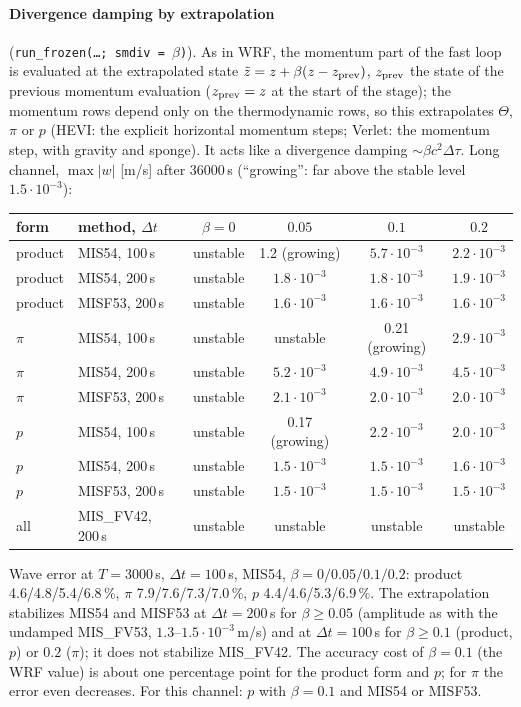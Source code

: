 \documentclass[11pt,a4paper]{article}
\newcommand{\code}[1]{\texttt{#1}}
\newcommand{\dt}{\Delta t}
\begin{document}
\paragraph{Divergence damping by extrapolation} (\code{run\_frozen(\dots; smdiv = $\beta$)}). As in WRF,
the momentum part of the fast loop is evaluated at the extrapolated state
$\tilde z=z+\beta(z-z_{\rm prev})$, $z_{\rm prev}$ the state of the previous momentum evaluation
($z_{\rm prev}=z$ at the start of the stage); the momentum rows depend only on the thermodynamic rows,
so this extrapolates $\Theta$, $\pi$ or $p$ (HEVI: the explicit horizontal momentum steps; Verlet: the
momentum step, with gravity and sponge). It acts like a divergence damping $\sim\beta c^2\Delta\tau$.
Long channel, $\max|w|$ [m/s] after 36000\,s (``growing'': far above the stable level
$1.5\cdot10^{-3}$):
\begin{center}\begin{tabular}{llcccc}\toprule
form & method, $\dt$ & $\beta=0$ & $0.05$ & $0.1$ & $0.2$\\\midrule
product & MIS54, 100\,s & unstable & 1.2 (growing) & $5.7\cdot10^{-3}$ & $2.2\cdot10^{-3}$\\
product & MIS54, 200\,s & unstable & $1.8\cdot10^{-3}$ & $1.8\cdot10^{-3}$ & $1.9\cdot10^{-3}$\\
product & MISF53, 200\,s & unstable & $1.6\cdot10^{-3}$ & $1.6\cdot10^{-3}$ & $1.6\cdot10^{-3}$\\
$\pi$ & MIS54, 100\,s & unstable & unstable & 0.21 (growing) & $2.9\cdot10^{-3}$\\
$\pi$ & MIS54, 200\,s & unstable & $5.2\cdot10^{-3}$ & $4.9\cdot10^{-3}$ & $4.5\cdot10^{-3}$\\
$\pi$ & MISF53, 200\,s & unstable & $2.1\cdot10^{-3}$ & $2.0\cdot10^{-3}$ & $2.0\cdot10^{-3}$\\
$p$ & MIS54, 100\,s & unstable & 0.17 (growing) & $2.2\cdot10^{-3}$ & $2.0\cdot10^{-3}$\\
$p$ & MIS54, 200\,s & unstable & $1.5\cdot10^{-3}$ & $1.5\cdot10^{-3}$ & $1.6\cdot10^{-3}$\\
$p$ & MISF53, 200\,s & unstable & $1.5\cdot10^{-3}$ & $1.5\cdot10^{-3}$ & $1.5\cdot10^{-3}$\\
all & MIS\_FV42, 200\,s & unstable & unstable & unstable & unstable\\\bottomrule
\end{tabular}\end{center}
Wave error at $T=3000$\,s, $\dt=100$\,s, MIS54, $\beta=0/0.05/0.1/0.2$: product 4.6/4.8/5.4/6.8\,\%,
$\pi$ 7.9/7.6/7.3/7.0\,\%, $p$ 4.4/4.6/5.3/6.9\,\%. The extrapolation stabilizes MIS54 and MISF53 at
$\dt=200$\,s for $\beta\ge0.05$ (amplitude as with the undamped MIS\_FV53, $1.3$--$1.5\cdot10^{-3}$\,m/s) and
at $\dt=100$\,s for $\beta\ge0.1$ (product, $p$) or $0.2$ ($\pi$); it does not stabilize MIS\_FV42. The
accuracy cost of $\beta=0.1$ (the WRF value) is about one percentage point for the product form and $p$;
for $\pi$ the error even decreases. For this channel: $p$ with $\beta=0.1$ and MIS54 or MISF53.
\end{document}
